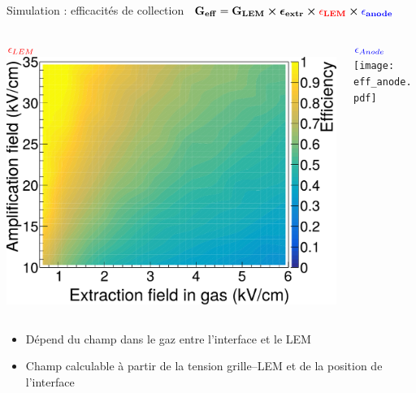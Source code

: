     \begin{frame}{Simulation : efficacités de collection}
        \hbox{
     		$\mathbf{G_{eff}=G_{LEM}\boldsymbol{\times}\boldsymbol{\epsilon}_{extr} \boldsymbol{\times}\textcolor{red}{\epsilon_{LEM}}\boldsymbol{\times} \textcolor{blue}{\epsilon_{anode}}}$
     	}\vspace{0.2cm}
   		\begin{columns}
            \begin{column}{0.5\textwidth}
                \centering $\textcolor{red}{\epsilon_{LEM}}$
                \includegraphics[width=\textwidth]{./pictures/eff_lem_alone.pdf}
            \end{column}\hfill
            \begin{column}{0.5\textwidth}
                \centering $\textcolor{blue}{\epsilon_{Anode}}$
                \texttt{[image: eff\_anode.pdf]}
            \end{column}
        \end{columns}
   		\begin{columns}
            \begin{column}{0.5\textwidth}
                \begin{scriptsize}
                    \begin{itemize}
                        \item Dépend du champ dans le gaz entre l'interface et le LEM
                        \item Champ calculable à partir de la tension grille--LEM et de la position de l'interface
                    \end{itemize}

\end{scriptsize}
\end{column}
\end{columns}
\end{frame}
